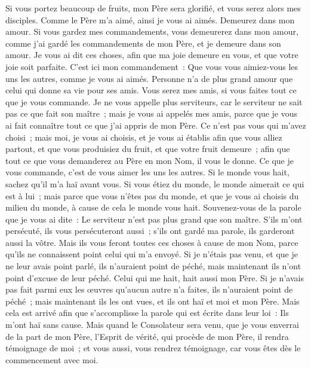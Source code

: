 \begin{multicols}{2}
Si vous portez beaucoup de fruits, mon Père sera glorifié, et vous serez alors mes disciples.
Comme le Père m'a aimé, ainsi je vous ai aimés. Demeurez dans mon amour.
Si vous gardez mes commandements, vous demeurerez dans mon amour, comme j'ai gardé les commandements de mon Père, et je demeure dans son amour.
Je vous ai dit ces choses, afin que ma joie demeure en vous, et que votre joie soit parfaite.
C'est ici mon commandement~: Que vous vous aimiez-vous les uns les autres, comme je vous ai aimés.
Personne n'a de plus grand amour que celui qui donne sa vie pour ses amis.
Vous serez mes amis, si vous faites tout ce que je vous commande.
Je ne vous appelle plus serviteurs, car le serviteur ne sait pas ce que fait son maître~; mais je vous ai appelés mes amis, parce que je vous ai fait connaître tout ce que j'ai appris de mon Père.
Ce n'est pas vous qui m'avez choisi~; mais moi, je vous ai choisis, et je vous ai établis afin que vous alliez partout, et que vous produisiez du fruit, et que votre fruit demeure~; afin que tout ce que vous demanderez au Père en mon Nom, il vous le donne.
Ce que je vous commande, c'est de vous aimer les uns les autres.
Si le monde vous hait, sachez qu'il m'a haï avant vous.
Si vous étiez du monde, le monde aimerait ce qui est à lui~; mais parce que vous n'êtes pas du monde, et que je vous ai choisis du milieu du monde, à cause de cela le monde vous hait.
Souvenez-vous de la parole que je vous ai dite~: Le serviteur n'est pas plus grand que son maître. S'ils m'ont persécuté, ils vous persécuteront aussi~; s'ils ont gardé ma parole, ils garderont aussi la vôtre.
Mais ils vous feront toutes ces choses à cause de mon Nom, parce qu'ils ne connaissent point celui qui m'a envoyé.
Si je n'étais pas venu, et que je ne leur avais point parlé, ils n'auraient point de péché, mais maintenant ils n'ont point d'excuse de leur péché.
Celui qui me hait, hait aussi mon Père.
Si je n'avais pas fait parmi eux les œuvres qu'aucun autre n'a faites, ils n'auraient point de péché~; mais maintenant ils les ont vues, et ils ont haï et moi et mon Père.
Mais cela est arrivé afin que s'accomplisse la parole qui est écrite dans leur loi~: Ils m'ont haï sans cause.
Mais quand le Consolateur sera venu, que je vous enverrai de la part de mon Père, l'Esprit de vérité, qui procède de mon Père, il rendra témoignage de moi~;
et vous aussi, vous rendrez témoignage, car vous êtes dès le commencement avec moi.

\end{multicols}
